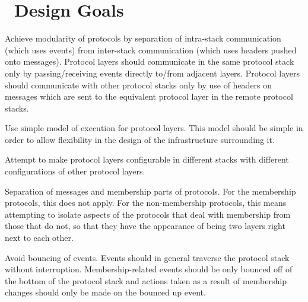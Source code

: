 \section{\ensemble\ Design Goals}

\item
Achieve modularity of protocols by separation of intra-stack communication
(which uses events) from inter-stack communication (which uses headers
pushed onto messages).  Protocol layers should communicate in the same
protocol stack only by passing/receiving events directly to/from adjacent
layers.  Protocol layers should communicate with other protocol stacks only
by use of headers on messages which are sent to the equivalent protocol
layer in the remote protocol stacks.
\item
Use simple model of execution for protocol layers.  This model should be
simple in order to allow flexibility in the design of the infrastructure
surrounding it.
\item
Attempt to make protocol layers configurable in different stacks with
different configurations of other protocol layers.
\item
Separation of messages and membership parts of protocols.  For the
membership protocols, this does not apply.  For the non-membership
protocols, this means attempting to isolate aspects of the protocols that
deal with membership from those that do not, so that they have the
appearance of being two layers right next to each other.
\item
Avoid bouncing of events.  Events should in general traverse the protocol
stack without interruption.  Membership-related events should be only
bounced off of the bottom of the protocol stack and actions taken as a
result of membership changes should only be made on the bounced up event.
